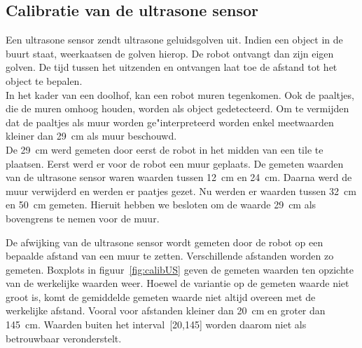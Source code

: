 \documentclass[tt3]{penoverslag}
\begin{document}
\subsection{Calibratie van de ultrasone sensor} %
\label{ssec:calibUS}
Een ultrasone sensor zendt ultrasone geluidsgolven uit. Indien een object in de buurt staat, weerkaatsen de golven hierop. De robot ontvangt dan zijn eigen golven. De tijd tussen het uitzenden en ontvangen laat toe de afstand tot het object te bepalen.\\

In het kader van een doolhof, kan een robot muren tegenkomen. Ook de paaltjes, die de muren omhoog houden, worden als object gedetecteerd. Om te vermijden dat de paaltjes als muur worden ge"interpreteerd worden enkel meetwaarden kleiner dan 29~cm als muur beschouwd.\\
De 29~cm werd gemeten door eerst de robot in het midden van een tile te plaatsen. Eerst werd er voor de robot een muur geplaats. De gemeten waarden van de ultrasone sensor waren waarden tussen 12~cm en 24~cm. Daarna werd de muur verwijderd en werden er paatjes gezet. Nu werden er waarden tussen 32~cm en 50~cm gemeten. Hieruit hebben we besloten om de waarde 29~cm als bovengrens te nemen voor de muur.

De afwijking van de ultrasone sensor wordt gemeten door de robot op een bepaalde afstand van een muur te zetten. Verschillende afstanden worden zo gemeten. Boxplots in figuur~\ref{fig:calibUS} geven de gemeten waarden ten opzichte van de werkelijke waarden weer. Hoewel de variantie op de gemeten waarde niet groot is, komt de gemiddelde gemeten waarde niet altijd overeen met de werkelijke afstand. Vooral voor afstanden kleiner dan 20~cm en groter dan 145~cm. Waarden buiten het interval~[20,145] worden daarom niet als betrouwbaar veronderstelt.
\end{document}
